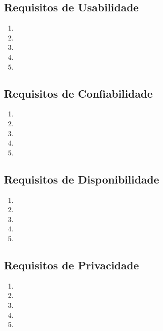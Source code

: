            \subsection{Requisitos de Usabilidade }
           \begin{enumerate}
             \item
             \item
             \item
             \item
             \item
           \end{enumerate}


           \subsection{Requisitos de Confiabilidade }
           \begin{enumerate}
             \item
             \item
             \item
             \item
             \item
           \end{enumerate}


           \subsection{Requisitos de Disponibilidade }
           \begin{enumerate}
             \item
             \item
             \item
             \item
             \item
           \end{enumerate}


           \subsection{Requisitos de Privacidade }
            \begin{enumerate}
             \item
             \item
             \item
             \item
             \item
           \end{enumerate}


